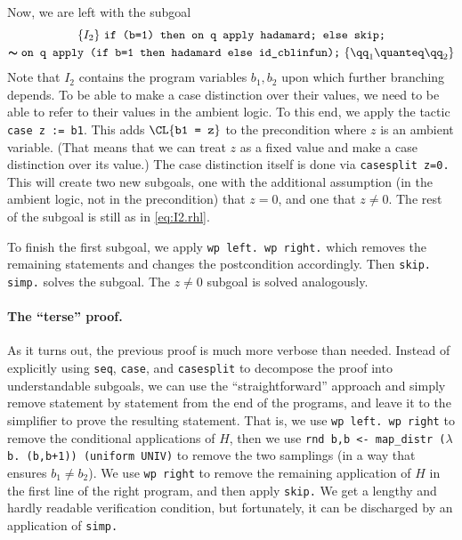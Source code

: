 \documentclass{article}
\begin{document}
Now, we are left with the subgoal
\begin{multline}
  \{I_2\}\
  {\texttt{if (b=1) then on q apply hadamard; else skip;}} \\
  \pmb\sim
  {\texttt{on q apply (if b=1 then hadamard else id\_cblinfun);}}
  \
  \{\qq_1\quanteq\qq_2\}
  \label{eq:I2.rhl}
\end{multline}
Note that $I_2$
contains the program variables $b_1,b_2$
upon which further branching depends. To be able to make a case
distinction over their values, we need to be able to refer to their
values in the ambient logic. To this end, we apply the tactic
\texttt{case z := b1}. This adds $\CL{\texttt{b1 = z}}$
to the precondition where $z$
is an ambient variable. (That means that we can treat $z$
as a fixed value and make a case distinction over its value.)  The
case distinction itself is done via \texttt{casesplit z=0.} This will
create two new subgoals, one with the additional assumption (in the
ambient logic, not in the precondition) that $z=0$,
and one that $z\neq 0$.
The rest of the subgoal is still as in \eqref{eq:I2.rhl}.

To finish the first subgoal, we apply \texttt{\frenchspacing wp left. wp right.}
which removes the remaining statements and changes the postcondition
accordingly. Then \texttt{\frenchspacing skip. simp.} solves the subgoal. The
$z\neq0$ subgoal is solved analogously.

\paragraph{The ``terse'' proof.} As it turns out, the previous proof
is much more verbose than needed. Instead of explicitly using
\texttt{seq}, \texttt{case}, and \texttt{casesplit} to decompose the
proof into understandable subgoals, we can use the ``straightforward''
approach and simply remove statement by statement from the end of the
programs, and leave it to the simplifier to prove the resulting
statement. That is, we use \texttt{wp left. wp right} to remove
the conditional applications of $H$,
then we use \texttt{\frenchspacing rnd b,b <- map\_distr ($\lambda$b. (b,b+1)) (uniform
  UNIV)} to remove the two samplings (in a way that ensures
$b_1\neq b_2$). We
use \texttt{wp right} to remove the remaining application of $H$
in the first line of the right program, and then apply \texttt{skip.}
We get a lengthy and hardly readable verification condition, but
fortunately, it can be discharged by an application of \texttt{simp.}
\end{document}

